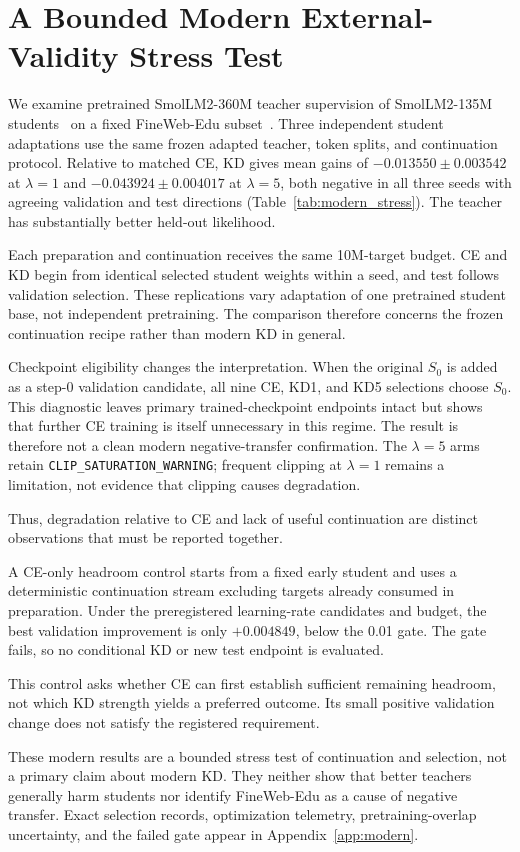 \section{A Bounded Modern External-Validity Stress Test}
\label{sec:external-validity}

We examine pretrained SmolLM2-360M teacher supervision of SmolLM2-135M students~\citep{benallal2025smollm2} on a fixed FineWeb-Edu subset~\citep{penedo2024fineweb}. Three independent student adaptations use the same frozen adapted teacher, token splits, and continuation protocol. Relative to matched CE, KD gives mean gains of $-0.013550\pm0.003542$ at $\lambda=1$ and $-0.043924\pm0.004017$ at $\lambda=5$, both negative in all three seeds with agreeing validation and test directions (Table~\ref{tab:modern_stress}). The teacher has substantially better held-out likelihood.

Each preparation and continuation receives the same 10M-target budget. CE and KD begin from identical selected student weights within a seed, and test follows validation selection. These replications vary adaptation of one pretrained student base, not independent pretraining. The comparison therefore concerns the frozen continuation recipe rather than modern KD in general.

Checkpoint eligibility changes the interpretation. When the original $S_0$ is added as a step-0 validation candidate, all nine CE, KD1, and KD5 selections choose $S_0$. This diagnostic leaves primary trained-checkpoint endpoints intact but shows that further CE training is itself unnecessary in this regime. The result is therefore not a clean modern negative-transfer confirmation. The $\lambda=5$ arms retain \texttt{CLIP\_SATURATION\_WARNING}; frequent clipping at $\lambda=1$ remains a limitation, not evidence that clipping causes degradation.

Thus, degradation relative to CE and lack of useful continuation are distinct observations that must be reported together.

A CE-only headroom control starts from a fixed early student and uses a deterministic continuation stream excluding targets already consumed in preparation. Under the preregistered learning-rate candidates and budget, the best validation improvement is only $+0.004849$, below the 0.01 gate. The gate fails, so no conditional KD or new test endpoint is evaluated.

This control asks whether CE can first establish sufficient remaining headroom, not which KD strength yields a preferred outcome. Its small positive validation change does not satisfy the registered requirement.

These modern results are a bounded stress test of continuation and selection, not a primary claim about modern KD. They neither show that better teachers generally harm students nor identify FineWeb-Edu as a cause of negative transfer. Exact selection records, optimization telemetry, pretraining-overlap uncertainty, and the failed gate appear in Appendix~\ref{app:modern}.


